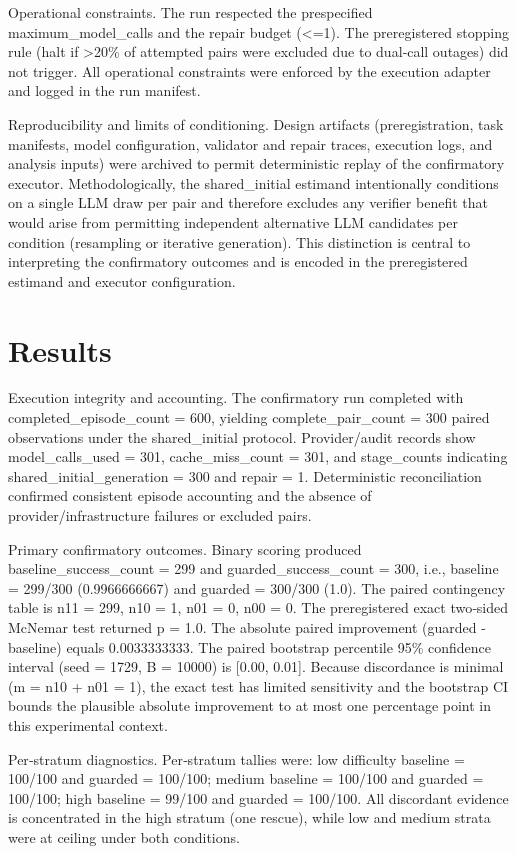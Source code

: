 \documentclass[conference]{IEEEtran}
\begin{document}
Operational constraints. The run respected the prespecified maximum\_model\_calls and the repair budget (<=1). The preregistered stopping rule (halt if >20\% of attempted pairs were excluded due to dual‑call outages) did not trigger. All operational constraints were enforced by the execution adapter and logged in the run manifest.

Reproducibility and limits of conditioning. Design artifacts (preregistration, task manifests, model configuration, validator and repair traces, execution logs, and analysis inputs) were archived to permit deterministic replay of the confirmatory executor. Methodologically, the shared\_initial estimand intentionally conditions on a single LLM draw per pair and therefore excludes any verifier benefit that would arise from permitting independent alternative LLM candidates per condition (resampling or iterative generation). This distinction is central to interpreting the confirmatory outcomes and is encoded in the preregistered estimand and executor configuration.

\section{Results}
Execution integrity and accounting. The confirmatory run completed with completed\_episode\_count = 600, yielding complete\_pair\_count = 300 paired observations under the shared\_initial protocol. Provider/audit records show model\_calls\_used = 301, cache\_miss\_count = 301, and stage\_counts indicating shared\_initial\_generation = 300 and repair = 1. Deterministic reconciliation confirmed consistent episode accounting and the absence of provider/infrastructure failures or excluded pairs.

Primary confirmatory outcomes. Binary scoring produced baseline\_success\_count = 299 and guarded\_success\_count = 300, i.e., baseline = 299/300 (0.9966666667) and guarded = 300/300 (1.0). The paired contingency table is n11 = 299, n10 = 1, n01 = 0, n00 = 0. The preregistered exact two‑sided McNemar test returned p = 1.0. The absolute paired improvement (guarded - baseline) equals 0.0033333333. The paired bootstrap percentile 95\% confidence interval (seed = 1729, B = 10000) is [0.00, 0.01]. Because discordance is minimal (m = n10 + n01 = 1), the exact test has limited sensitivity and the bootstrap CI bounds the plausible absolute improvement to at most one percentage point in this experimental context.

Per‑stratum diagnostics. Per‑stratum tallies were: low difficulty baseline = 100/100 and guarded = 100/100; medium baseline = 100/100 and guarded = 100/100; high baseline = 99/100 and guarded = 100/100. All discordant evidence is concentrated in the high stratum (one rescue), while low and medium strata were at ceiling under both conditions.
\end{document}
